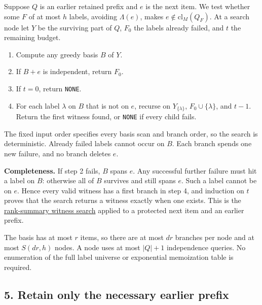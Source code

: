 Suppose \(Q\) is an earlier retained prefix and \(e\) is the next item. We test whether some \(F\) of at most \(h\) labels, avoiding \(\Lambda(e)\), makes \(e\notin\mathrm{cl}_M(Q_F)\). At a search node let \(Y\) be the surviving part of \(Q\), \(F_0\) the labels already failed, and \(t\) the remaining budget.

\begin{enumerate}
\def\labelenumi{\arabic{enumi}.}
\tightlist
\item
  Compute any greedy basis \(B\) of \(Y\).
\item
  If \(B+e\) is independent, return \(F_0\).
\item
  If \(t=0\), return \texttt{NONE}.
\item
  For each label \(\lambda\) on \(B\) that is not on \(e\), recurse on \(Y_{\{\lambda\}}\), \(F_0\cup\{\lambda\}\), and \(t-1\). Return the first witness found, or \texttt{NONE} if every child fails.
\end{enumerate}

The fixed input order specifies every basis scan and branch order, so the search is deterministic. Already failed labels cannot occur on \(B\). Each branch spends one new failure, and no branch deletes \(e\).

\textbf{Completeness.} If step 2 fails, \(B\) spans \(e\). Any successful further failure must hit a label on \(B\): otherwise all of \(B\) survives and still spans \(e\). Such a label cannot be on \(e\). Hence every valid witness has a first branch in step 4, and induction on \(t\) proves that the search returns a witness exactly when one exists. This is the \href{https://github.com/icekylinx/algorithm-frontier/blob/main/problems/matroid-failure-summaries/manuscripts/arbitrary-matroid-and-submodular-failure-summaries.md\#5-a-deterministic-failure-witness-search}{rank-summary witness search} applied to a protected next item and an earlier prefix.

The basis has at most \(r\) items, so there are at most \(dr\) branches per node and at most \(S(dr,h)\) nodes. A node uses at most \(|Q|+1\) independence queries. No enumeration of the full label universe or exponential memoization table is required.

\hypertarget{af-eb38c0014f-retain-only-the-necessary-earlier-prefix}{%
\subsection{5. Retain only the necessary earlier prefix}\label{af-eb38c0014f-retain-only-the-necessary-earlier-prefix}}

